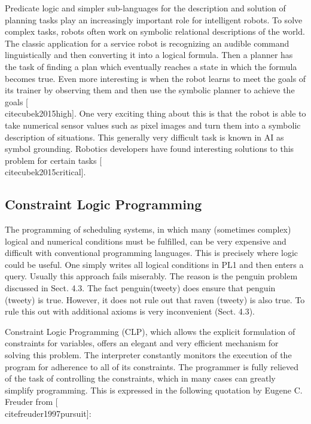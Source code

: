 \documentclass[10pt]{book}
\begin{document}
Predicate logic and simpler sub-languages for the description and solution of planning tasks play an increasingly important role for intelligent robots. To solve complex tasks, robots often work on symbolic relational descriptions of the world. The classic application for a service robot is recognizing an audible command linguistically and then converting it into a logical formula. Then a planner has the task of finding a plan which eventually reaches a state in which the formula becomes true. Even more interesting is when the robot learns to meet the goals of its trainer by observing them and then use the symbolic planner to achieve the goals [\\cite{cubek2015high}]. One very exciting thing about this is that the robot is able to take numerical sensor values such as pixel images and turn them into a symbolic description of situations. This generally very difficult task is known in AI as symbol grounding. Robotics developers have found interesting solutions to this problem for certain tasks [\\cite{cubek2015critical}].

\subsection*{Constraint Logic Programming}
The programming of scheduling systems, in which many (sometimes complex) logical and numerical conditions must be fulfilled, can be very expensive and difficult with conventional programming languages. This is precisely where logic could be useful. One simply writes all logical conditions in PL1 and then enters a query. Usually this approach fails miserably. The reason is the penguin problem discussed in Sect. 4.3. The fact penguin(tweety) does ensure that penguin (tweety) is true. However, it does not rule out that raven (tweety) is also true. To rule this out with additional axioms is very inconvenient (Sect. 4.3).

Constraint Logic Programming (CLP), which allows the explicit formulation of constraints for variables, offers an elegant and very efficient mechanism for solving this problem. The interpreter constantly monitors the execution of the program for adherence to all of its constraints. The programmer is fully relieved of the task of controlling the constraints, which in many cases can greatly simplify programming. This is expressed in the following quotation by Eugene C. Freuder from [\\cite{freuder1997pursuit}]:
\end{document}

